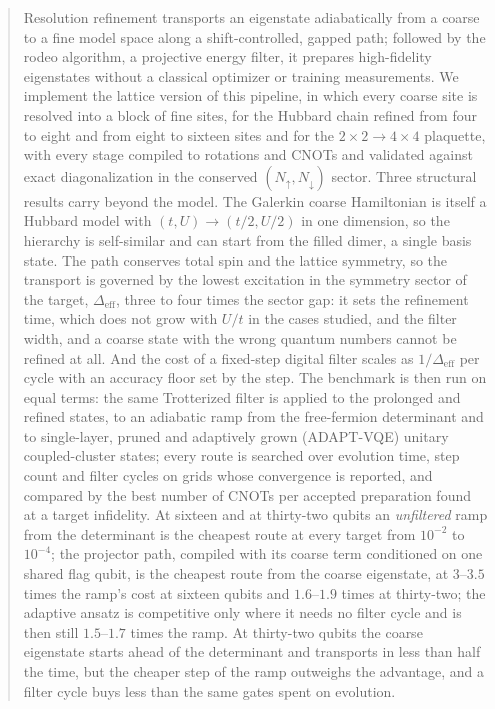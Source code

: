 \documentclass[a4paper,11pt,noarxiv]{quantumarticle}
\newcommand{\Deff}{\Delta_{\mathrm{eff}}}
\begin{document}
\begin{abstract}
Resolution refinement transports an eigenstate adiabatically from a coarse
to a fine model space along a shift-controlled, gapped path; followed by the
rodeo algorithm, a projective energy filter, it prepares high-fidelity
eigenstates without a classical optimizer or training measurements.  We
implement the lattice version of this pipeline, in which every coarse site
is resolved into a block of fine sites, for the Hubbard chain refined from
four to eight and from eight to sixteen sites and for the
$2\times2\to4\times4$ plaquette, with every stage compiled to rotations and
CNOTs and validated against exact diagonalization in the conserved
$(N_\uparrow,N_\downarrow)$ sector.  Three structural results carry beyond
the model.  The Galerkin coarse Hamiltonian is itself a Hubbard model with
$(t,U)\to(t/2,U/2)$ in one dimension, so the hierarchy is self-similar and
can start from the filled dimer, a single basis state.  The path conserves
total spin and the lattice symmetry, so the transport is governed by the
lowest excitation in the symmetry sector of the target, $\Deff$, three to
four times the sector gap: it sets the refinement time, which does not grow
with $U/t$ in the cases studied, and the filter width, and a coarse state
with the wrong quantum numbers cannot be refined at all.  And the cost of a
fixed-step digital filter scales as $1/\Deff$ per cycle with an accuracy
floor set by the step.  The benchmark is then run on equal terms: the same
Trotterized filter is applied to the prolonged and refined states, to an
adiabatic ramp from the free-fermion determinant and to single-layer,
pruned and adaptively grown (ADAPT-VQE) unitary coupled-cluster states;
every route is searched over evolution time, step count and filter
cycles on grids whose convergence is reported, and compared by the best
number of CNOTs per accepted preparation found at a target infidelity.  At
sixteen and at thirty-two qubits an \emph{unfiltered} ramp from the
determinant is the cheapest route at every target from $10^{-2}$ to
$10^{-4}$; the projector path, compiled with its coarse term conditioned on
one shared flag qubit, is the cheapest route from the coarse eigenstate,
at $3$--$3.5$ times the ramp's cost at sixteen qubits and $1.6$--$1.9$
times at thirty-two; the adaptive ansatz is competitive only where it
needs no filter cycle and is then still $1.5$--$1.7$ times the ramp.  At
thirty-two qubits the coarse eigenstate starts ahead of the determinant
and transports in less than half the time, but the cheaper step of the
ramp outweighs the advantage, and a filter cycle buys less than the same
gates spent on evolution.
\end{abstract}
\end{document}
